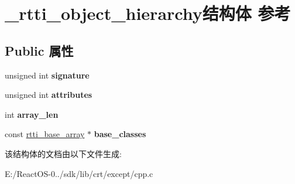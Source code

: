 \hypertarget{struct__rtti__object__hierarchy}{}\section{\+\_\+rtti\+\_\+object\+\_\+hierarchy结构体 参考}
\label{struct__rtti__object__hierarchy}
\subsection*{Public 属性}
\begin{DoxyCompactItemize}
\item 
\mbox{\label{struct__rtti__object__hierarchy_a0b67f0022b7a57bf6765012a9a0eb91d}} 
unsigned int {\bfseries signature}
\item 
\mbox{\label{struct__rtti__object__hierarchy_ace832716e70cddbcd5fc4e0904442aa2}} 
unsigned int {\bfseries attributes}
\item 
\mbox{\label{struct__rtti__object__hierarchy_a126803d4e5dfbdd6a20367cf672ee117}} 
int {\bfseries array\+\_\+len}
\item 
\mbox{\label{struct__rtti__object__hierarchy_afb1fa34500df017c6b0ee8962dc89db8}} 
const \hyperlink{struct__rtti__base__array}{rtti\+\_\+base\+\_\+array} $\ast$ {\bfseries base\+\_\+classes}
\end{DoxyCompactItemize}


该结构体的文档由以下文件生成\+:\begin{DoxyCompactItemize}
\item 
E\+:/\+React\+O\+S-\/0../sdk/lib/crt/except/cpp.\+c\end{DoxyCompactItemize}
